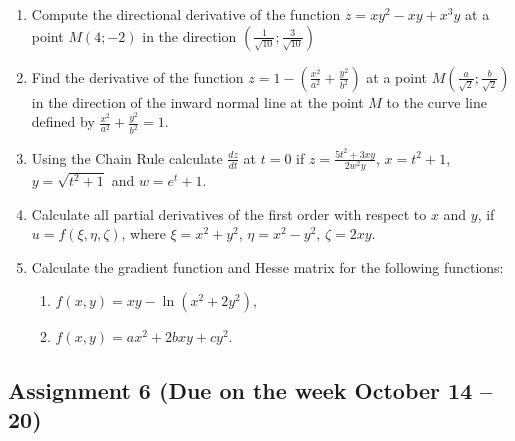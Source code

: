 \documentclass[12pt]{article} %
\theoremstyle{definition} %
\begin{document}
\begin{enumerate}

\item Compute the directional derivative of the function $z=xy^2-xy+x^3y$ at a point
$M (4; -2)$ in the direction $\left(\frac 1{\sqrt{10}};\frac 3{\sqrt{10}}\right)$ 

\item Find the derivative of the function $z=1-\left(\frac{x^2}{a^2}+\frac{y^2}{b^2}\right)$ at a point $M\left(\frac a{\sqrt{2}};\frac b{\sqrt{2}}\right)$  in the direction of the inward normal line at the point $M$ to the curve line defined by $\frac{x^2}{a^2}+\frac{y^2}{b^2}=1$.

\item Using the Chain Rule calculate $\frac{dz}{dt}$ at $t=0$ if $z=\frac{5t^2+3xy}{2w^2y}$, $x=t^2+1$, $y=\sqrt{t^2+1}$ and $w=e^t+1$.

\item Calculate all partial derivatives of the first order with respect to $x$ and $y$, if $u=f(\xi,\eta,\zeta)$, where $\xi=x^2+y^2$, $\eta=x^2-y^2$, $\zeta=2xy$.

\item Calculate the gradient function and Hesse matrix for the following functions:
 \begin{enumerate}
 \item $f(x,y)=xy-\ln (x^2+2y^2),$
 \item $f(x,y)=ax^2+2bxy+cy^2.$
 \end{enumerate}

\end{enumerate} 


\subsection*{Assignment 6 (Due on the week October 14 – 20)}
\end{document}
